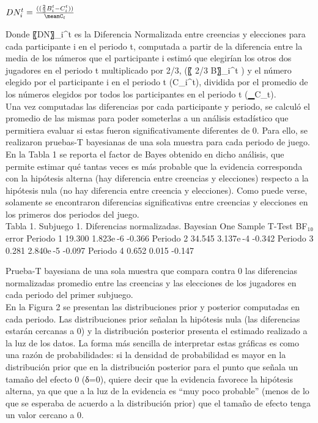 \begin{center}
$DN_i^t =  \frac{((\frac{2}{3} B_i^t - C_i^t))}{\meanC_t} $
\end{center}

Donde 〖DN〗_i^t es la Diferencia Normalizada entre creencias y elecciones para cada participante i en el periodo t, computada a partir de la diferencia entre  la media de los números que el participante i estimó que elegirían los otros dos jugadores en el periodo t multiplicado por 2/3,  (〖 2/3 B〗_i^t  ) y el número elegido por el participante i en el periodo t (C_i^t), dividida por el promedio de los números elegidos por todos los participantes en el periodo t (▁C_t).\\

Una vez computadas las diferencias por cada participante y periodo, se calculó el promedio de las mismas para poder someterlas a un análisis estadístico que permitiera evaluar si estas fueron significativamente diferentes de 0. Para ello, se realizaron pruebas-T bayesianas de una sola muestra para cada periodo de juego. En la Tabla 1 se reporta el factor de Bayes obtenido en dicho análisis, que permite estimar qué tantas veces es más probable que la evidencia corresponda con la hipótesis alterna (hay diferencia entre creencias y elecciones) respecto a la hipótesis nula (no hay diferencia entre creencia y elecciones). Como puede verse, solamente se encontraron diferencias significativas entre creencias y elecciones en los primeros dos periodos del juego.\\

Tabla 1. Subjuego 1. Diferencias normalizadas.
Bayesian One Sample T-Test 	
  	BF₁₀ 	error %
Periodo 1 		19.300 		1.823e -6 		-0.366 
Periodo 2 		34.545 		3.137e -4 		-0.342 
Periodo 3 		0.281 		2.840e -5 		-0.097 
Periodo 4 		0.652 		0.015 		-0.147 
	
Prueba-T bayesiana de una sola muestra que compara contra 0 las diferencias normalizadas promedio entre las creencias y las elecciones de los jugadores en cada periodo del primer subjuego.\\


En la Figura 2 se presentan las distribuciones prior y posterior computadas en cada periodo. Las distribuciones prior señalan la hipótesis nula (las diferencias estarán cercanas a 0) y la distribución posterior presenta el estimado realizado a la luz de los datos. La forma más sencilla de interpretar estas gráficas es como una razón de probabilidades: si la densidad de probabilidad es mayor en la distribución prior que en la distribución posterior para el punto que señala un tamaño del efecto 0 (δ=0), quiere decir que la evidencia favorece la hipótesis alterna, ya que que a la luz de la evidencia es “muy poco probable” (menos de lo que se esperaba de acuerdo a la distribución prior) que el tamaño de efecto tenga un valor cercano a 0.\\
  
